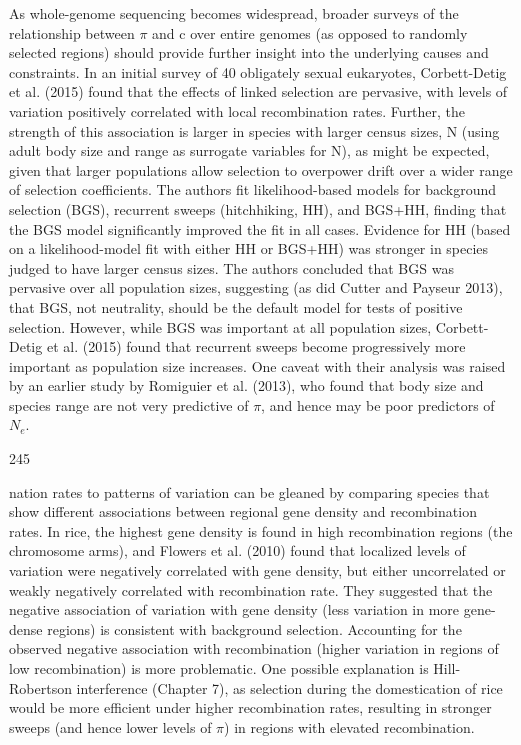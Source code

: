 \documentclass{article}
\begin{document}
As whole-genome sequencing becomes widespread, broader surveys of the relationship between  $ \pi $ and c over entire genomes (as opposed to randomly selected regions) should provide further insight into the underlying causes and constraints. In an initial survey of 40 obligately sexual eukaryotes, Corbett-Detig et al. (2015) found that the effects of linked selection are pervasive, with levels of variation positively correlated with local recombination rates. Further, the strength of this association is larger in species with larger census sizes, N (using adult body size and range as surrogate variables for N), as might be expected, given that larger populations allow selection to overpower drift over a wider range of selection coefficients. The authors fit likelihood-based models for background selection (BGS), recurrent sweeps (hitchhiking, HH), and BGS+HH, finding that the BGS model significantly improved the fit in all cases. Evidence for HH (based on a likelihood-model fit with either HH or BGS+HH) was stronger in species judged to have larger census sizes. The authors concluded that BGS was pervasive over all population sizes, suggesting (as did Cutter and Payseur 2013), that BGS, not neutrality, should be the default model for tests of positive selection. However, while BGS was important at all population sizes, Corbett-Detig et al. (2015) found that recurrent sweeps become progressively more important as population size increases. One caveat with their analysis was raised by an earlier study by Romiguier et al. (2013), who found that body size and species range are not very predictive of  $ \pi $, and hence may be poor predictors of  $ N_{e} $.

245

nation rates to patterns of variation can be gleaned by comparing species that show different associations between regional gene density and recombination rates. In rice, the highest gene density is found in high recombination regions (the chromosome arms), and Flowers et al. (2010) found that localized levels of variation were negatively correlated with gene density, but either uncorrelated or weakly negatively correlated with recombination rate. They suggested that the negative association of variation with gene density (less variation in more gene-dense regions) is consistent with background selection. Accounting for the observed negative association with recombination (higher variation in regions of low recombination) is more problematic. One possible explanation is Hill-Robertson interference (Chapter 7), as selection during the domestication of rice would be more efficient under higher recombination rates, resulting in stronger sweeps (and hence lower levels of  $ \pi $) in regions with elevated recombination.
\end{document}

